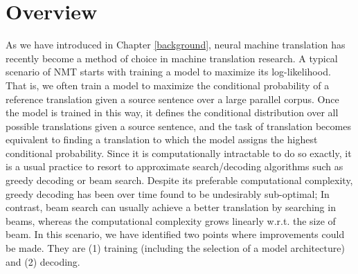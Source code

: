 \section{Overview}
\label{cp7.sec.introduction}

As we have introduced in Chapter \ref{background}, neural machine translation has recently become a method of choice in machine translation research.  
A typical scenario of  NMT starts with training a model to maximize its log-likelihood. That is, we often train a model to maximize the conditional probability of a reference translation given a source sentence over a large parallel corpus. 
Once the model is trained in this way, it defines the conditional distribution over all possible translations given a source sentence, and the task of translation becomes equivalent to finding a translation to which the model assigns the highest conditional probability. Since it is computationally intractable to do so exactly, it is a usual practice to resort to approximate search/decoding algorithms such as greedy decoding or beam search. Despite its preferable computational complexity, greedy decoding has been over time found to be undesirably sub-optimal; In contrast, beam search can usually achieve a better translation by searching in beams, whereas  the computational complexity grows linearly w.r.t. the size of beam. 
In this scenario, we have identified two points where improvements could be made. They are (1) training (including the selection of a model architecture) and (2) decoding.



